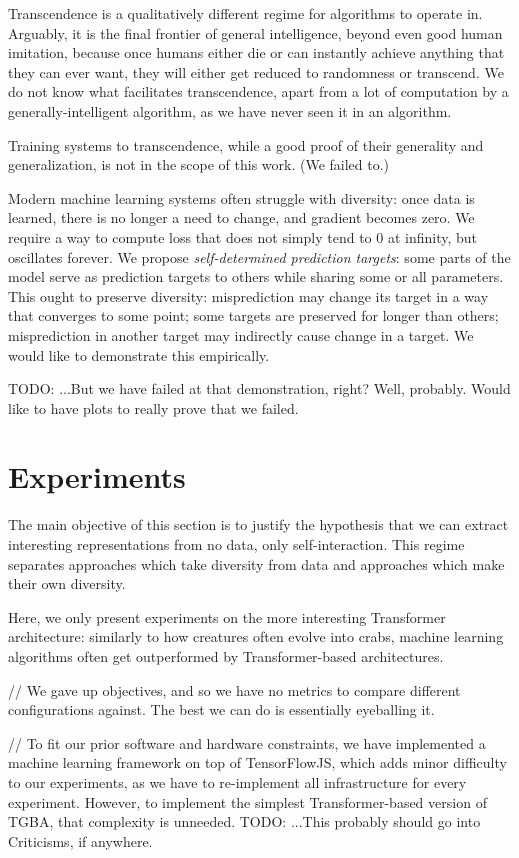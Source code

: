 \documentclass{article}
\begin{document}
Transcendence is a qualitatively different regime for algorithms to operate in. Arguably, it is the final frontier of general intelligence, beyond even good human imitation, because once humans either die or can instantly achieve anything that they can ever want, they will either get reduced to randomness or transcend. We do not know what facilitates transcendence, apart from a lot of computation by a generally-intelligent algorithm, as we have never seen it in an algorithm.

Training systems to transcendence, while a good proof of their generality and generalization, is not in the scope of this work. (We failed to.)

Modern machine learning systems often struggle with diversity: once data is learned, there is no longer a need to change, and gradient becomes zero. We require a way to compute loss that does not simply tend to $0$ at infinity, but oscillates forever. We propose \textit{self-determined prediction targets}: some parts of the model serve as prediction targets to others while sharing some or all parameters. This ought to preserve diversity: misprediction may change its target in a way that converges to some point; some targets are preserved for longer than others; misprediction in another target may indirectly cause change in a target. We would like to demonstrate this empirically.

    TODO: ...But we have failed at that demonstration, right? Well, probably. Would like to have plots to really prove that we failed.

\section{Experiments}

The main objective of this section is to justify the hypothesis that we can extract interesting representations from no data, only self-interaction. This regime separates approaches which take diversity from data and approaches which make their own diversity.

Here, we only present experiments on the more interesting Transformer architecture: similarly to how creatures often evolve into crabs, machine learning algorithms often get outperformed by Transformer-based architectures.

// We gave up objectives, and so we have no metrics to compare different configurations against. The best we can do is essentially eyeballing it.

// To fit our prior software and hardware constraints, we have implemented a machine learning framework on top of TensorFlowJS, which adds minor difficulty to our experiments, as we have to re-implement all infrastructure for every experiment. However, to implement the simplest Transformer-based version of TGBA, that complexity is unneeded. TODO: ...This probably should go into Criticisms, if anywhere.
\end{document}
